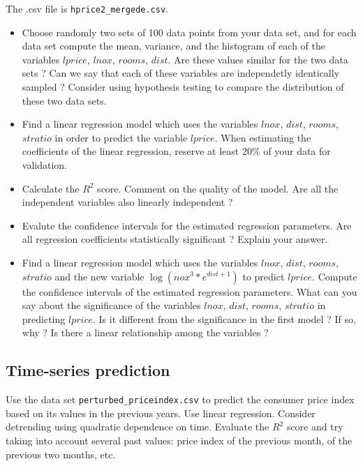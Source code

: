 \documentclass{article}
\begin{document}
   The .csv file is \lstinline$hprice2_mergede.csv$.

    
 \begin{itemize}
	 \item Choose randomly two sets of 100 data points from your data set, and for each data set compute the mean, variance, and the histogram
	of each of the variables  $lprice$, $lnox$, $rooms$,  $dist$. 
	Are these values similar for the two data sets ?  Can we say that each of these variables are independetly identically sampled ? 
	Consider using hypothesis testing to compare the distribution of these two data sets.

   \item Find a linear regression model which uses the variables $lnox$, $dist$, $rooms$, $stratio$  in order to predict the variable $lprice$.
     When estimating the coefficients of the linear regression, reserve at least 20\% of your data for validation.
  \item Calculate the $R^2$ score. Comment on the quality of the model. Are all the independent variables also linearly independent ?
  \item Evalute the confidence intervals for the estimated regression parameters. Are all regression coefficients statistically significant ? Explain your answer.
  \item Find a  linear regression model which uses the variables $lnox$, $dist$, $rooms$, $stratio$ and the new variable
	$\log(nox^3*e^{dist+1})$ to predict $lprice$. Compute the confidence intervals of the estimated regression parameters.
	What can you say about the significance of the variables $lnox$, $dist$, $rooms$, $stratio$ in predicting $lprice$.
	Is it different from the significance in the first model ? If so, why ? Is there a linear relationship among the variables ? 
  \end{itemize}

   
 \subsection*{Time-series prediction}
   Use the data set \lstinline$perturbed_priceindex.csv$
    to predict the consumer price index 
   based on its values in the previous years.    Use linear regression.
   Consider detrending using quadratic dependence on time.  
   Evaluate the $R^2$ score and try taking into account several past values: price index  of the previous month, of the previous two months, etc. 
\end{document}
